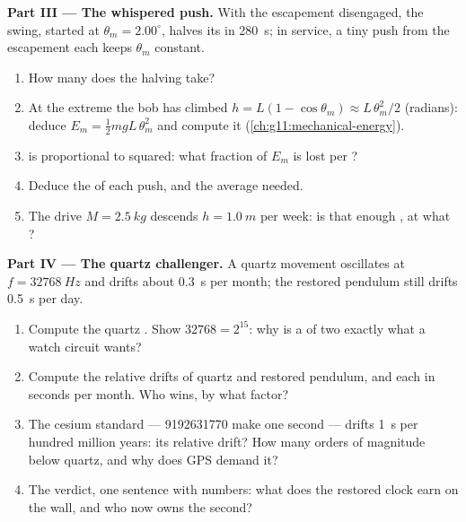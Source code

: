 \begin{problem}
\medskip
\noindent\textbf{Part III --- The whispered push.} With the escapement
disengaged, the swing, started at  $\theta_m = 2.00^\circ$,
halves its  in \qty{280}{s}; in service, a tiny push from the
escapement each  keeps $\theta_m$ constant.
\begin{enumerate}[resume]
  \item How many  does the halving take?
  \item At the extreme the bob has climbed $h = L(1 - \cos\theta_m)
        \approx L\,\theta_m^2/2$ (radians): deduce $E_m = \tfrac12
        m g L\,\theta_m^2$ and compute it
        (\cref{ch:g11:mechanical-energy}).
  \item {} is proportional to  squared: what fraction of
        $E_m$ is lost per ?
  \item Deduce the  of each push, and the average  needed.
  \item The drive  $M = \qty{2.5}{kg}$ descends $h =
        \qty{1.0}{m}$ per week: is that enough , at what ?
\end{enumerate}

\medskip
\noindent\textbf{Part IV --- The quartz challenger.} A quartz
movement oscillates at $f = \qty{32768}{Hz}$ and drifts about
\qty{0.3}{s} per month; the restored pendulum still drifts
\qty{0.5}{s} per day.
\begin{enumerate}[resume]
  \item Compute the quartz . Show $\num{32768} = 2^{15}$: why
        is a  of two exactly what a watch circuit wants?
  \item Compute the relative drifts of quartz and restored pendulum,
        and each in seconds per month. Who wins, by what factor?
  \item The cesium standard --- \num{9192631770}  make one
        second --- drifts \qty{1}{s} per hundred million years: its
        relative drift? How many orders of magnitude below quartz,
        and why does GPS demand it?
  \item The verdict, one sentence with numbers: what does the restored
        clock earn on the wall, and who now owns the second?
\end{enumerate}
\end{problem}
